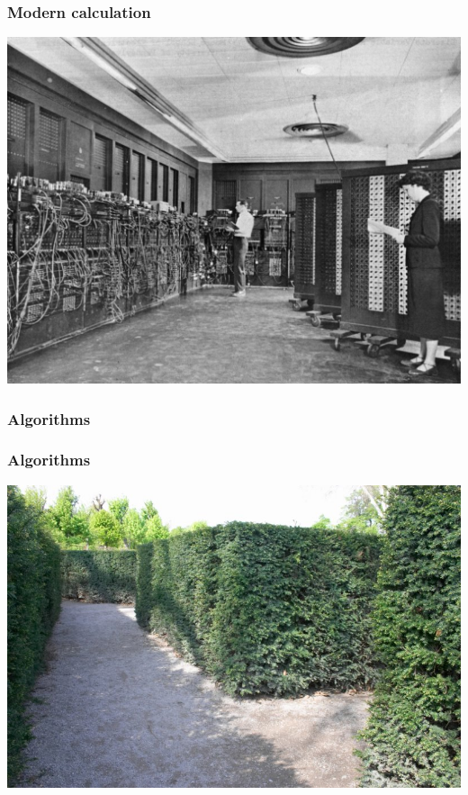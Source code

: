 \documentclass[11pt]{beamer}
\begin{document}
\begin{frame}[fragile]
  \frametitle{Modern calculation}

  \includegraphics[height=0.75\textheight]{./img/eniac.jpg}
\end{frame}

\begin{frame}[fragile]
  \frametitle{Algorithms}
\end{frame}

\begin{frame}[fragile]
  \frametitle{Algorithms}

  \includegraphics[height=0.75\textheight]{./img/hedge-maze.jpg}
\end{frame}
\end{document}
